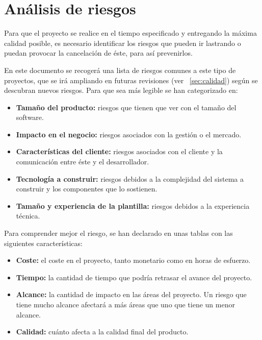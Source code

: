 \section{Análisis de riesgos}\label{sec:riesgos}
\par Para que el proyecto se realice en el tiempo especificado y entregando la máxima calidad posible, es necesario identificar los riesgos que pueden ir lastrando o puedan provocar la cancelación de éste, para así prevenirlos.
\par En este documento se recogerá una lista de riesgos comunes a este tipo de proyectos, que se irá ampliando en futuras revisiones (ver ~\ref{sec:calidad}) según se descubran nuevos riesgos. Para que sea más legible se han categorizado en:

\begin{itemize}[-]
\item \textbf{Tamaño del producto:} riesgos que tienen que ver con el tamaño del software.
\item \textbf{Impacto en el negocio:} riesgos asociados con  la gestión o el mercado.
\item \textbf{Características del cliente:} riesgos asociados con el cliente y la comunicación entre éste y el desarrollador.
\item \textbf{Tecnología a construir:} riesgos debidos a la complejidad del sistema a construir y los componentes que lo sostienen.
\item \textbf{Tamaño y experiencia de la plantilla:} riesgos debidos a la experiencia técnica.
\end{itemize}

\par Para comprender mejor el riesgo, se han declarado en unas tablas con las siguientes características:
\begin{itemize}
	\item \textbf{Coste:} el coste en el proyecto, tanto monetario como en horas de esfuerzo.
	\item \textbf{Tiempo:} la cantidad de tiempo que podría retrasar el avance del proyecto.
	\item \textbf{Alcance:} la cantidad de impacto en las áreas del proyecto. Un riesgo que tiene mucho alcance afectará a más áreas que uno que tiene un menor alcance.
	\item \textbf{Calidad:} cuánto afecta a la calidad final del producto.
\end{itemize}

